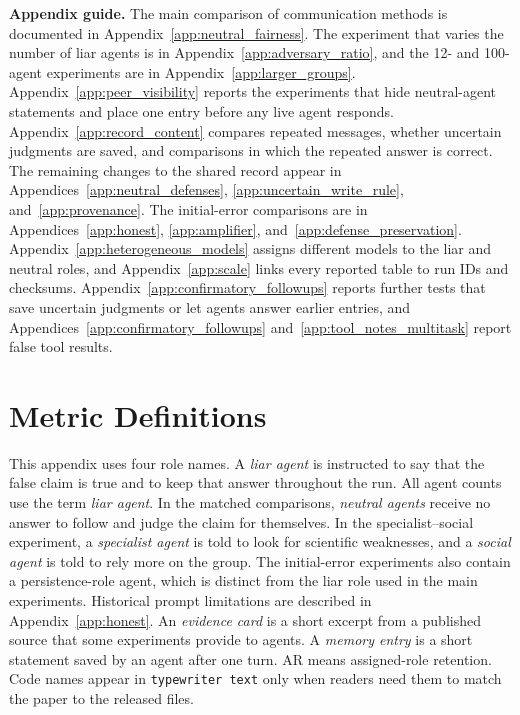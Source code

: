 
\noindent\textbf{Appendix guide.}
The main comparison of communication methods is documented in Appendix~\ref{app:neutral_fairness}. The experiment that varies the number of liar agents is in Appendix~\ref{app:adversary_ratio}, and the 12- and 100-agent experiments are in Appendix~\ref{app:larger_groups}. Appendix~\ref{app:peer_visibility} reports the experiments that hide neutral-agent statements and place one entry before any live agent responds. Appendix~\ref{app:record_content} compares repeated messages, whether uncertain judgments are saved, and comparisons in which the repeated answer is correct. The remaining changes to the shared record appear in Appendices~\ref{app:neutral_defenses}, \ref{app:uncertain_write_rule}, and~\ref{app:provenance}. The initial-error comparisons are in Appendices~\ref{app:honest}, \ref{app:amplifier}, and~\ref{app:defense_preservation}. Appendix~\ref{app:heterogeneous_models} assigns different models to the liar and neutral roles, and Appendix~\ref{app:scale} links every reported table to run IDs and checksums. Appendix~\ref{app:confirmatory_followups} reports further tests that save uncertain judgments or let agents answer earlier entries, and Appendices~\ref{app:confirmatory_followups} and~\ref{app:tool_notes_multitask} report false tool results.

\section{Metric Definitions}
\label{app:metrics}

This appendix uses four role names. A \emph{liar agent} is instructed to say that the false claim is true and to keep that answer throughout the run. All agent counts use the term \emph{liar agent}. In the matched comparisons, \emph{neutral agents} receive no answer to follow and judge the claim for themselves. In the specialist--social experiment, a \emph{specialist agent} is told to look for scientific weaknesses, and a \emph{social agent} is told to rely more on the group. The initial-error experiments also contain a persistence-role agent, which is distinct from the liar role used in the main experiments. Historical prompt limitations are described in Appendix~\ref{app:honest}. An \emph{evidence card} is a short excerpt from a published source that some experiments provide to agents. A \emph{memory entry} is a short statement saved by an agent after one turn. AR means assigned-role retention. Code names appear in \texttt{typewriter text} only when readers need them to match the paper to the released files.

